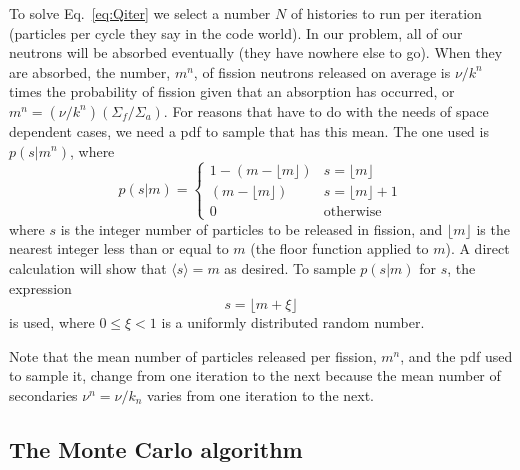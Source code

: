 \documentclass[12pt]{article}
\begin{document}
To solve Eq.~\ref{eq:Qiter} we select a number $N$ of histories to run per iteration (particles per cycle they say in the code world).  In our problem, all of our neutrons will be absorbed eventually (they have nowhere else to go).  When they are absorbed, the number, $m^n$, of fission neutrons released on average is $\nu/k^n$ times the probability of fission given that an absorption has occurred, or $m^n = (\nu/k^n) (\Sigma_f/\Sigma_a)$.  For reasons that have to do with the needs of space dependent cases, we need a pdf to sample that has this mean.  The one used is $p(s|m^n)$, where
\begin{equation}
p(s|m) = \begin{cases}
1 - (m - \lfloor m \rfloor) &s = \lfloor m \rfloor\\
(m - \lfloor m \rfloor) &s = \lfloor m \rfloor + 1\\
0&\text{otherwise}
\end{cases}
\end{equation}
where $s$ is the integer number of particles to be released in fission, and $\lfloor m \rfloor$ is the nearest integer less than or equal to $m$ (the floor function applied to $m$).  A direct calculation will show that $\langle s \rangle = m$ as desired.
To sample $p(s|m)$ for $s$, the expression
\begin{equation}
s = \bigl\lfloor m + \xi \bigr\rfloor
\end{equation}
is used, where $0 \leq \xi < 1$ is a uniformly distributed random number.

Note that the mean number of particles released per fission, $m^n$, and the pdf used to sample it, change from one iteration to the next because the mean number of secondaries $\nu^n = \nu/k_n$ varies from one iteration to the next.

\subsection{The Monte Carlo algorithm}
\end{document}
